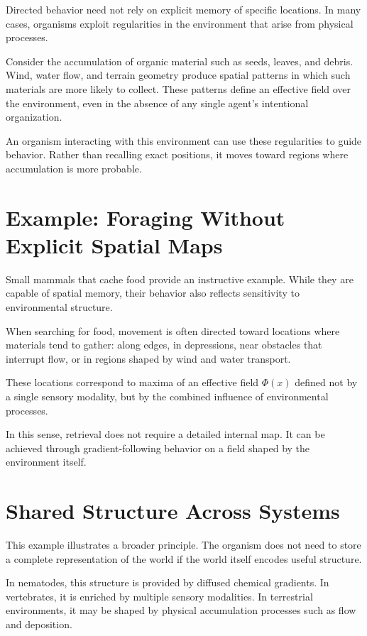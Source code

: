 \documentclass[11pt,oneside]{book}
\begin{document}
Directed behavior need not rely on explicit memory of specific locations. In many cases, organisms exploit regularities in the environment that arise from physical processes.

Consider the accumulation of organic material such as seeds, leaves, and debris. Wind, water flow, and terrain geometry produce spatial patterns in which such materials are more likely to collect. These patterns define an effective field over the environment, even in the absence of any single agent’s intentional organization.

An organism interacting with this environment can use these regularities to guide behavior. Rather than recalling exact positions, it moves toward regions where accumulation is more probable.

\section{Example: Foraging Without Explicit Spatial Maps}

Small mammals that cache food provide an instructive example. While they are capable of spatial memory, their behavior also reflects sensitivity to environmental structure.

When searching for food, movement is often directed toward locations where materials tend to gather: along edges, in depressions, near obstacles that interrupt flow, or in regions shaped by wind and water transport.

These locations correspond to maxima of an effective field $\Phi(x)$ defined not by a single sensory modality, but by the combined influence of environmental processes.

In this sense, retrieval does not require a detailed internal map. It can be achieved through gradient-following behavior on a field shaped by the environment itself.

\section{Shared Structure Across Systems}

This example illustrates a broader principle. The organism does not need to store a complete representation of the world if the world itself encodes useful structure.

In nematodes, this structure is provided by diffused chemical gradients. In vertebrates, it is enriched by multiple sensory modalities. In terrestrial environments, it may be shaped by physical accumulation processes such as flow and deposition.
\end{document}
